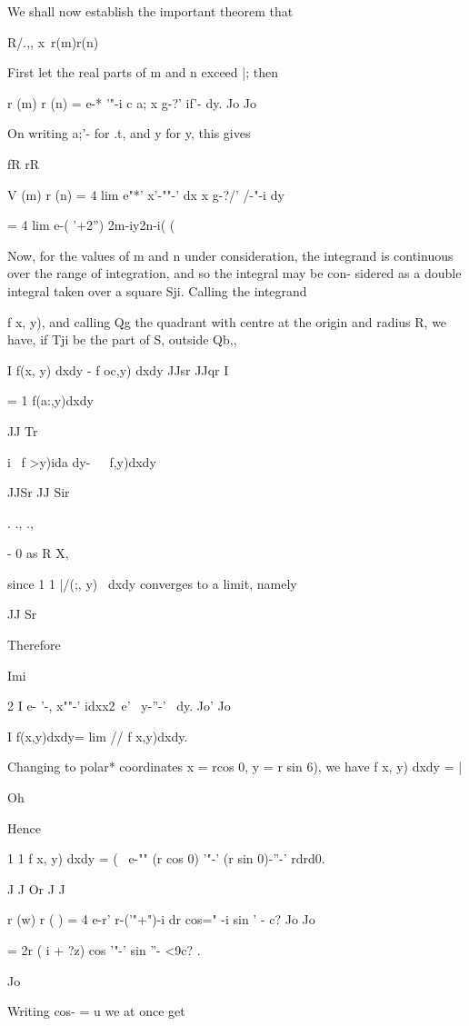 We shall now establish the important theorem that

R/.,, x\ r(m)r(n)

First let the real parts of m and n exceed |; then

r (m) r (n) = e-* '"-i c a; x g-?' if'- dy. Jo Jo

On writing a;'- for .t, and y for y, this gives

fR rR

V (m) r (n) = 4 lim e"*' x'-""-' dx x g-?/' /-"-i dy

= 4 lim e-( '+2'') 2m-iy2n-i( ( \

Now, for the values of m and n under consideration, the integrand is
continuous over the range of integration, and so the integral may be
con- sidered as a double integral taken over a square Sji. Calling the
integrand

%
%

f x, y), and calling Qg the quadrant with centre at the origin and
radius R, we have, if Tji be the part of S, outside Qb,,

I f(x, y) dxdy - f oc,y) dxdy JJsr JJqr I

= 1 f(a:,y)dxdy

 JJ Tr

i \ f >y)ida dy-\ \ \ f,y)dxdy\

JJSr JJ Sir

  . ., .,

- 0 as R X,

since 1 1 |/(;, y) \ dxdy converges to a limit, namely

JJ Sr

Therefore

Imi

2 I e- '-, x""-' idxx2\ e' \ y-''-' \ dy. Jo' Jo

I f(x,y)dxdy= lim // f x,y)dxdy.

Changing to polar* coordinates x = rcos 0, y = r sin 6), we have f x,
y) dxdy = |

Oh

Hence

1 1 f x, y) dxdy = ( \ e-"" (r cos 0) '"-' (r sin 0)-''-' rdrd0.

J J Or J J

r (w) r ( ) = 4 e-r' r-('"+")-i dr cos=" -i sin ' - c? Jo Jo

= 2r ( i + ?z) cos '"-' sin ''- <9c? .

Jo

Writing cos- = u we at once get

